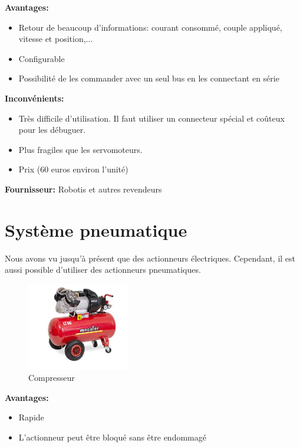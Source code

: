 \documentclass[a4paper, 11pt]{report}
\begin{document}
\textbf{Avantages:}
\begin{itemize}
\item Retour de beaucoup d'informations: courant consommé, couple appliqué, vitesse et position,...
\item Configurable
\item Possibilité de les commander avec un seul bus en les connectant en série
\end{itemize}

\textbf{Inconvénients:}
\begin{itemize}
\item Très difficile d'utilisation. Il faut utiliser un connecteur spécial et coûteux pour les débuguer.
\item Plus fragiles que les servomoteurs.
\item Prix (60 euros environ l'unité)
\end{itemize} 

\textbf{Fournisseur:} Robotis et autres revendeurs

\chapter{Système pneumatique}
Nous avons vu jusqu'à présent que des actionneurs électriques. Cependant, il est aussi possible d'utiliser des actionneurs pneumatiques.

\begin{figure}
\begin{centering}
\includegraphics[width=0.4\textwidth]{images/compresseur.jpg}
\caption{Compresseur}
\par\end{centering}
\end{figure}

\textbf{Avantages:}
\begin{itemize}
\item Rapide
\item L'actionneur peut être bloqué sans être endommagé
\end{itemize}
\end{document}
